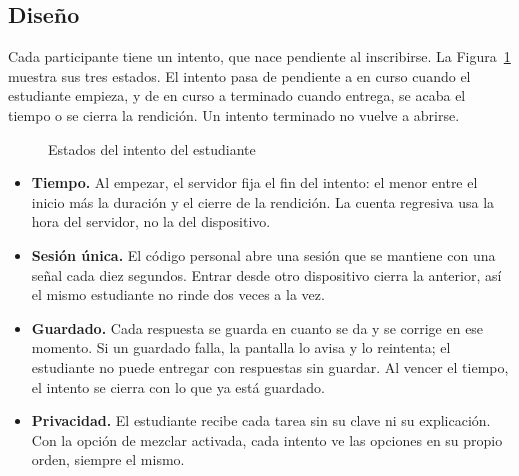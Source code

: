 \subsection{Diseño}

Cada participante tiene un intento, que nace pendiente al inscribirse. La Figura~\ref{fig:estados_intento} muestra sus tres estados. El intento pasa de pendiente a en curso cuando el estudiante empieza, y de en curso a terminado cuando entrega, se acaba el tiempo o se cierra la rendición. Un intento terminado no vuelve a abrirse.

\begin{figure}[H]
\centering
{}
\caption{Estados del intento del estudiante}
\label{fig:estados_intento}
\end{figure}

\begin{itemize}
    \item \textbf{Tiempo.} Al empezar, el servidor fija el fin del intento: el menor entre el inicio más la duración y el cierre de la rendición. La cuenta regresiva usa la hora del servidor, no la del dispositivo.
    \item \textbf{Sesión única.} El código personal abre una sesión que se mantiene con una señal cada diez segundos. Entrar desde otro dispositivo cierra la anterior, así el mismo estudiante no rinde dos veces a la vez.
    \item \textbf{Guardado.} Cada respuesta se guarda en cuanto se da y se corrige en ese momento. Si un guardado falla, la pantalla lo avisa y lo reintenta; el estudiante no puede entregar con respuestas sin guardar. Al vencer el tiempo, el intento se cierra con lo que ya está guardado.
    \item \textbf{Privacidad.} El estudiante recibe cada tarea sin su clave ni su explicación. Con la opción de mezclar activada, cada intento ve las opciones en su propio orden, siempre el mismo.
\end{itemize}

